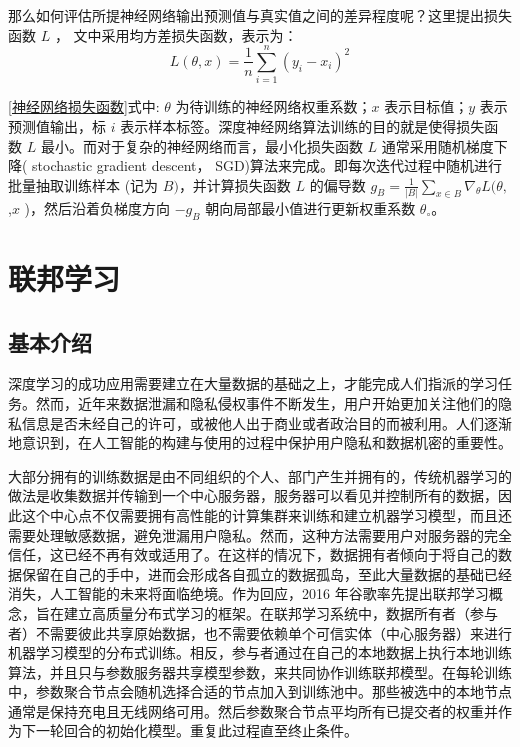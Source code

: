 那么如何评估所提神经网络输出预测值与真实值之间的差异程度呢？这里提出损失函数 $L$ ， 文中采用均方差损失函数，表示为：
\begin{equation}\label{神经网络损失函数}
L(\theta,x)=\frac{1}{n} \sum_{i=1}^{n}\left(y_{i}-x_{i}\right)^{2}
\end{equation}

\ref{神经网络损失函数}式中: $\theta$ 为待训练的神经网络权重系数；$x$ 表示目标值；$y$ 表示预测值输出，标 $i$ 表示样本标签。深度神经网络算法训练的目的就是使得损失函数 $L$ 最小。而对于复杂的神经网络而言，最小化损失函数 $L$ 通常采用随机梯度下降( stochastic gradient descent， SGD)算法来完成。即每次迭代过程中随机进行批量抽取训练样本 (记为 $B)$，并计算损失函数 $L$ 的偏导数 $g_{B}=\frac{1}{|B|} \sum_{x \in B} \nabla_{\theta} L(\theta,$,$x$ )，然后沿着负梯度方向 $-g_{B}$ 朝向局部最小值进行更新权重系数 $\theta_{\circ}$。

\section{联邦学习}

\subsection{基本介绍}
深度学习的成功应用需要建立在大量数据的基础之上，才能完成人们指派的学习任务。然而，近年来数据泄漏和隐私侵权事件不断发生，用户开始更加关注他们的隐私信息是否未经自己的许可，或被他人出于商业或者政治目的而被利用。人们逐渐地意识到，在人工智能的构建与使用的过程中保护用户隐私和数据机密的重要性。

大部分拥有的训练数据是由不同组织的个人、部门产生并拥有的，传统机器学习的做法是收集数据并传输到一个中心服务器，服务器可以看见并控制所有的数据，因此这个中心点不仅需要拥有高性能的计算集群来训练和建立机器学习模型，而且还需要处理敏感数据，避免泄漏用户隐私。然而，这种方法需要用户对服务器的完全信任，这已经不再有效或适用了。在这样的情况下，数据拥有者倾向于将自己的数据保留在自己的手中，进而会形成各自孤立的数据孤岛，至此大量数据的基础已经消失，人工智能的未来将面临绝境。作为回应，2016 年谷歌率先提出联邦学习概念，旨在建立高质量分布式学习的框架。在联邦学习系统中，数据所有者（参与者）不需要彼此共享原始数据，也不需要依赖单个可信实体（中心服务器）来进行机器学习模型的分布式训练。相反，参与者通过在自己的本地数据上执行本地训练算法，并且只与参数服务器共享模型参数，来共同协作训练联邦模型。在每轮训练中，参数聚合节点会随机选择合适的节点加入到训练池中。那些被选中的本地节点通常是保持充电且无线网络可用。然后参数聚合节点平均所有已提交者的权重并作为下一轮回合的初始化模型。重复此过程直至终止条件。

